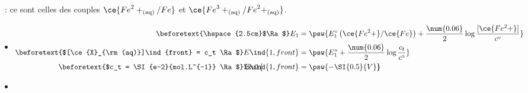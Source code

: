 \documentclass[../../main/main.tex]{subfiles}
\begin{document}
\begin{tcb*}[breakable]
\begin{minipage}[c]{.30\linewidth}
\begin{center}
{			}
		\end{center}
	\end{minipage}
	\tcblower
	\begin{enumerate}[label=\sqenumi]
		~: ce sont celles des couples
		$\ce{{Fe}^2+_{\rm(aq)}/Fe}$ et $\ce{{Fe}^3+_{\rm(aq)}/{Fe}^2+_{\rm(aq)}}$.
		\begin{itemize}
			\item
			      \vspace{-15pt}
			      \begin{align*}
				      \beforetext{\hspace{2.5cm}$\Ra$}
				      E_1
				                     & =
				      \psw{%
					      E_1^\circ \left( \ce{Fe^2+}/\ce{Fe} \right) +
					      \frac{\num{0.06}}{2} \log \frac{[\ce{Fe^2+}]}{c^\circ}
				      }%
				      \\
				      \beforetext{$[\ce{X}_{\rm(aq)}]\ind{front} = c_t \Ra $}
				      E\ind{1,front} & =
				      \psw{E_1^\circ + \frac{\num{0.06}}{2}\log \frac{c_t}{c^\circ}}
				      \\
				      \beforetext{$c_t = \SI{e-2}{mol.L^{-1}} \Ra$}
				      \makebox[0pt][l]{$\xul{\phantom{E\ind{1,front} = - \SI{0.5}{V}}}$}
				      E\ind{1,front} & =
				      \psw{- \SI{0.5}{V}}
			      \end{align*}
			      \vspace{-15pt}
			\item
			      \vspace{-15pt}
		\end{itemize}

\end{enumerate}
\end{tcb*}
\end{document}
